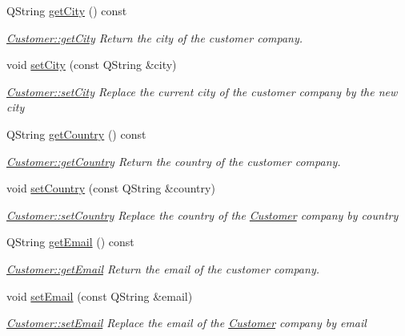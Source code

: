 \begin{DoxyCompactItemize}
Q\-String \hyperlink{classModels_1_1Customer_ace3f86c1e5108ede84a1a09516b37e50}{get\-City} () const 
\begin{DoxyCompactList}\small\item\em \hyperlink{classModels_1_1Customer_ace3f86c1e5108ede84a1a09516b37e50}{Customer\-::get\-City} Return the city of the customer company. \end{DoxyCompactList}\item 
void \hyperlink{classModels_1_1Customer_a069b40292e037762ec5e5836682c50b0}{set\-City} (const Q\-String \&city)
\begin{DoxyCompactList}\small\item\em \hyperlink{classModels_1_1Customer_a069b40292e037762ec5e5836682c50b0}{Customer\-::set\-City} Replace the current city of the customer company by the new {\itshape city} \end{DoxyCompactList}\item 
Q\-String \hyperlink{classModels_1_1Customer_a70ecabd20451f2b7c24d22a931c94cc3}{get\-Country} () const 
\begin{DoxyCompactList}\small\item\em \hyperlink{classModels_1_1Customer_a70ecabd20451f2b7c24d22a931c94cc3}{Customer\-::get\-Country} Return the country of the customer company. \end{DoxyCompactList}\item 
void \hyperlink{classModels_1_1Customer_afd430475dc1bf7f9b1548767265aa821}{set\-Country} (const Q\-String \&country)
\begin{DoxyCompactList}\small\item\em \hyperlink{classModels_1_1Customer_afd430475dc1bf7f9b1548767265aa821}{Customer\-::set\-Country} Replace the country of the \hyperlink{classModels_1_1Customer}{Customer} company by {\itshape country} \end{DoxyCompactList}\item 
Q\-String \hyperlink{classModels_1_1Customer_ac8d55fcc6f53b2269a01efbe43e75133}{get\-Email} () const 
\begin{DoxyCompactList}\small\item\em \hyperlink{classModels_1_1Customer_ac8d55fcc6f53b2269a01efbe43e75133}{Customer\-::get\-Email} Return the email of the customer company. \end{DoxyCompactList}\item 
void \hyperlink{classModels_1_1Customer_ab8f728a2e05c5c9c7a6f6522b85a59a1}{set\-Email} (const Q\-String \&email)
\begin{DoxyCompactList}\small\item\em \hyperlink{classModels_1_1Customer_ab8f728a2e05c5c9c7a6f6522b85a59a1}{Customer\-::set\-Email} Replace the email of the \hyperlink{classModels_1_1Customer}{Customer} company by {\itshape email} \end{DoxyCompactList}\item 

\end{DoxyCompactItemize}

